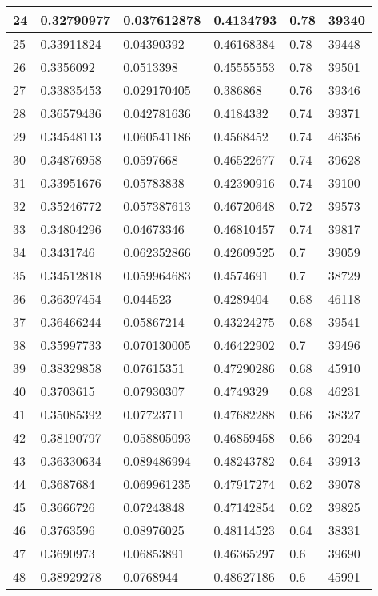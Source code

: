 \begin{longtable}{|l|l|l|l|l|l|}
24 & 0.32790977 & 0.037612878 & 0.4134793 & 0.78 & 39340 \\ \hline 
25 & 0.33911824 & 0.04390392 & 0.46168384 & 0.78 & 39448 \\ \hline 
26 & 0.3356092 & 0.0513398 & 0.45555553 & 0.78 & 39501 \\ \hline 
27 & 0.33835453 & 0.029170405 & 0.386868 & 0.76 & 39346 \\ \hline 
28 & 0.36579436 & 0.042781636 & 0.4184332 & 0.74 & 39371 \\ \hline 
29 & 0.34548113 & 0.060541186 & 0.4568452 & 0.74 & 46356 \\ \hline 
30 & 0.34876958 & 0.0597668 & 0.46522677 & 0.74 & 39628 \\ \hline 
31 & 0.33951676 & 0.05783838 & 0.42390916 & 0.74 & 39100 \\ \hline 
32 & 0.35246772 & 0.057387613 & 0.46720648 & 0.72 & 39573 \\ \hline 
33 & 0.34804296 & 0.04673346 & 0.46810457 & 0.74 & 39817 \\ \hline 
34 & 0.3431746 & 0.062352866 & 0.42609525 & 0.7 & 39059 \\ \hline 
35 & 0.34512818 & 0.059964683 & 0.4574691 & 0.7 & 38729 \\ \hline 
36 & 0.36397454 & 0.044523 & 0.4289404 & 0.68 & 46118 \\ \hline 
37 & 0.36466244 & 0.05867214 & 0.43224275 & 0.68 & 39541 \\ \hline 
38 & 0.35997733 & 0.070130005 & 0.46422902 & 0.7 & 39496 \\ \hline 
39 & 0.38329858 & 0.07615351 & 0.47290286 & 0.68 & 45910 \\ \hline 
40 & 0.3703615 & 0.07930307 & 0.4749329 & 0.68 & 46231 \\ \hline 
41 & 0.35085392 & 0.07723711 & 0.47682288 & 0.66 & 38327 \\ \hline 
42 & 0.38190797 & 0.058805093 & 0.46859458 & 0.66 & 39294 \\ \hline 
43 & 0.36330634 & 0.089486994 & 0.48243782 & 0.64 & 39913 \\ \hline 
44 & 0.3687684 & 0.069961235 & 0.47917274 & 0.62 & 39078 \\ \hline 
45 & 0.3666726 & 0.07243848 & 0.47142854 & 0.62 & 39825 \\ \hline 
46 & 0.3763596 & 0.08976025 & 0.48114523 & 0.64 & 38331 \\ \hline 
47 & 0.3690973 & 0.06853891 & 0.46365297 & 0.6 & 39690 \\ \hline 
48 & 0.38929278 & 0.0768944 & 0.48627186 & 0.6 & 45991 \\ \hline 

\end{longtable}
